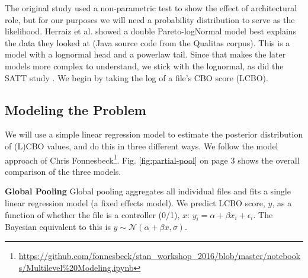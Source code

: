 \documentclass[sigconf,natbib=false]{acmart}
\begin{document}
The original study used a non-parametric test to show the effect of architectural role, but for our purposes we will need a probability distribution to serve as the likelihood. Herraiz et al. \cite{Herraiz2012} showed a double Pareto-logNormal model best explains the data they looked at (Java source code from the Qualitas corpus). This is a model with a lognormal head and a powerlaw tail. Since that makes the later models more complex to understand, we stick with the lognormal, as did the SATT study \cite{Aniche2016}. We begin by taking the log of a file's CBO score (LCBO).



\subsection{Modeling the Problem}
We will use a simple linear regression model to estimate the posterior distribution of (L)CBO values, and do this in three different ways. We follow the model approach of Chris Fonnesbeck\footnote{\url{https://github.com/fonnesbeck/stan\_workshop\_2016/blob/master/notebooks/Multilevel\%20Modeling.ipynb}}. Fig. \ref{fig:partial-pool} on page 3 shows the overall comparison of the three models.

\noindent\textbf{Global Pooling}
Global pooling aggregates all individual files and fits a single linear regression model (a fixed effects model). We predict LCBO score, $y$, as a function of whether the file is a controller (0/1), $x$: $ y_i = \alpha + \beta x_i + \epsilon_i$. The Bayesian equivalent to this is $y \sim \mathcal{N}(\alpha + \beta x, \sigma)$.
\end{document}
